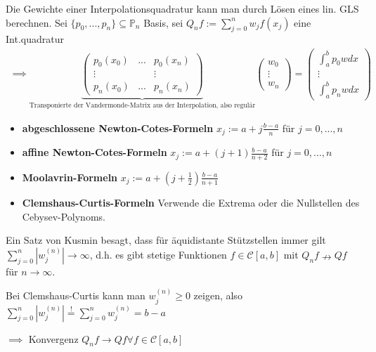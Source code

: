 \begin{remark}
	Die Gewichte einer Interpolationsquadratur kann man durch Lösen eines lin. GLS berechnen. Sei $\{p_0, ..., p_n\} \subseteq \mathbb{P}_n$ Basis, sei $Q_nf := \sum_{j=0}^{n} w_j f(x_j)$ eine Int.quadratur
	\begin{align*}
		\implies \underbrace{\left(\begin{matrix}
				p_0(x_0) & ... & p_0(x_n)\\
				\vdots & & \vdots\\
				p_n(x_0) & ... & p_n(x_n)
			\end{matrix}\right)}_{\text{Transponierte der Vandermonde-Matrix aus der Interpolation, also regulär}}
		\left(\begin{matrix}
			w_0\\ \vdots\\ w_n
		\end{matrix}\right) =
		\left(\begin{matrix}
			\int_{a}^{b} p_0 w dx\\ \vdots \\ \int_{a}^{b} p_n w dx
		\end{matrix}\right)
	\end{align*}
\end{remark}

\begin{example}
	\begin{itemize}
		\item \textbf{abgeschlossene Newton-Cotes-Formeln} $x_j := a + j \frac{b-a}{n}$ für $j=0, ..., n$
		\item \textbf{affine Newton-Cotes-Formeln} $x_j := a + (j+1) \frac{b-a}{n+2}$ für $j=0, ..., n$
		\item \textbf{Moolavrin-Formeln} $x_j := a + (j+\frac{1}{2}) \frac{b-a}{n+1}$
		\item \textbf{Clemshaus-Curtis-Formeln} Verwende die Extrema oder die Nullstellen des Cebysev-Polynoms.
	\end{itemize}
\end{example}

\begin{remark}
	Ein Satz von Kusmin besagt, dass für äquidistante Stützstellen immer gilt $\sum_{j=0}^{n} |w_j^{(n)}| \rightarrow\infty$, d.h. es gibt stetige Funktionen $f \in \mathcal{C}[a,b]$ mit $Q_nf \nrightarrow Qf$ für $n \rightarrow\infty$.
	
	Bei Clemshaus-Curtis kann man $w_j^{(n)} \geq 0$ zeigen, also $\sum_{j=0}^{n} |w_j^{(n)}| \overset{!}{=} \sum_{j=0}^{n} w_j^{(n)} = b-a$
	
	$\implies$ Konvergenz $Q_nf \rightarrow Qf \forall f \in \mathcal{C}[a,b]$
\end{remark}

